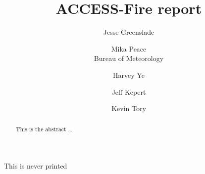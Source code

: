 \title{ACCESS-Fire report}

\author{
  Jesse Greenslade\\
  \and
  Mika Peace\\
  Bureau of Meteorology\\
  \and
  Harvey Ye\\
  \and
  Jeff Kepert\\
  \and
  Kevin Tory\\
}





  \maketitle
  \tableofcontents
  
  \begin{abstract}
  This is the abstract \ldots
  \end{abstract}
  
  
  
  
  
  
  
  
  
  
  



This is never printed
